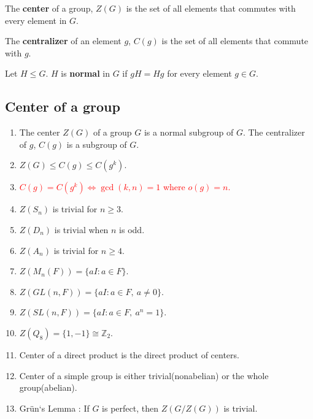 \begin{definition}
	The \textbf{center} of a group, $Z(G)$ is the set of all elements that commutes with every element in $G$.
\end{definition}
\begin{definition}
	The \textbf{centralizer} of an element $g$, $C(g)$ is the set of all elements that commute with $g$.
\end{definition}
\begin{definition}
	Let $H \le G$. $H$ is \textbf{normal} in $G$ if $gH = Hg$ for every element $g \in G$.
\end{definition}

\subsection{Center of a group}
\begin{enumerate}
	\item The center $Z(G)$ of a group $G$ is a normal subgroup of $G$. The centralizer of $g$, $C(g)$ is a subgroup of $G$.
	\item $Z(G) \le C(g) \le C(g^k)$.
	\item \textcolor{red}{$C(g) = C(g^k) \iff \gcd(k,n) = 1$ where $o(g)=n$.}
	\item $Z(S_n)$ is trivial for $n \ge 3$.
	\item $Z(D_n)$ is trivial when $n$ is odd.
	\item $Z(A_n)$ is trivial for $n \ge 4$.
	\item $Z(M_n(F)) = \{ aI : a \in F \}$.
	\item $Z(GL(n,F)) = \{ aI : a \in F,\ a \ne 0 \}$.
	\item $Z(SL(n,F)) = \{ aI : a \in F,\ a^n = 1 \}$.
	\item $Z(Q_8) = \{ 1,-1 \} \cong \mathbb{Z}_2$.
	\item Center of a direct product is the direct product of centers.
	\item Center of a simple group is either trivial(nonabelian) or the whole group(abelian).
	\item Gr\"un`s Lemma : If $G$ is perfect, then $Z(G/Z(G))$ is trivial.
\end{enumerate}

